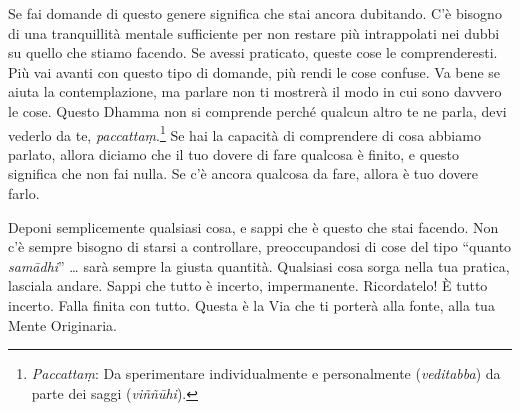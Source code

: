 Se fai domande di questo genere significa che stai ancora dubitando. C'è
bisogno di una tranquillità mentale sufficiente per non restare più
intrappolati nei dubbi su quello che stiamo facendo. Se avessi
praticato, queste cose le comprenderesti. Più vai avanti con questo tipo
di domande, più rendi le cose confuse. Va bene se aiuta la
contemplazione, ma parlare non ti mostrerà il modo in cui sono davvero
le cose. Questo Dhamma non si comprende perché qualcun altro te ne
parla, devi vederlo da te, \emph{paccattaṃ}.\footnote{\emph{Paccattaṃ}:
  Da sperimentare individualmente e personalmente (\emph{veditabba}) da
  parte dei saggi (\emph{viññūhi}).} Se hai la capacità di comprendere
di cosa abbiamo parlato, allora diciamo che il tuo dovere di fare
qualcosa è finito, e questo significa che non fai nulla. Se c'è ancora
qualcosa da fare, allora è tuo dovere farlo.

Deponi semplicemente qualsiasi cosa, e sappi che è questo che stai
facendo. Non c'è sempre bisogno di starsi a controllare, preoccupandosi
di cose del tipo ``quanto \emph{samādhi}'' \ldots{} sarà sempre la giusta
quantità. Qualsiasi cosa sorga nella tua pratica, lasciala andare. Sappi
che tutto è incerto, impermanente. Ricordatelo! È tutto incerto. Falla
finita con tutto. Questa è la Via che ti porterà alla fonte, alla tua
Mente Originaria.

